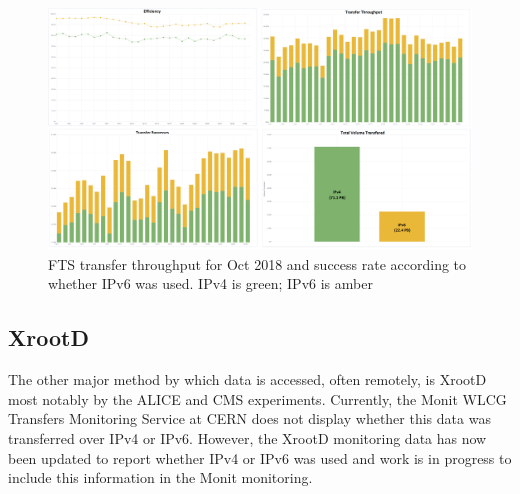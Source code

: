 \begin{figure}[t]
\centering
\includegraphics[width=13cm]{FTS-IPv6-figure}
\caption{FTS transfer throughput for Oct 2018 and success rate according to whether IPv6 was used. IPv4 is green; IPv6 is amber}
\label{fig:fts}
\end{figure}

\subsection{XrootD}
The other major method by which data is accessed, often remotely, is XrootD most notably by the ALICE and CMS experiments. Currently, the Monit WLCG Transfers Monitoring Service at CERN \cite{grafana-WLCG-Transfers} does not display whether this data was transferred over IPv4 or IPv6. However, the XrootD monitoring data has now been updated to report whether IPv4 or IPv6 was used \cite{xrootd-ipv6} and work is in progress to include this information in the Monit monitoring.


